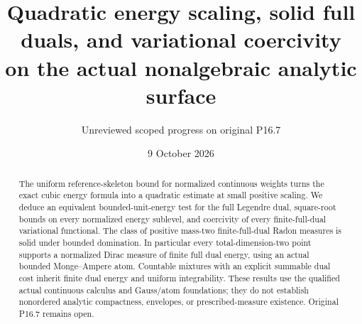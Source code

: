\documentclass[11pt]{article}
\title{Quadratic energy scaling, solid full duals, and variational coercivity\\on the actual nonalgebraic analytic surface}
\author{Unreviewed scoped progress on original P16.7}
\date{9 October 2026}
\begin{document}
\maketitle
\begin{abstract}
The uniform reference-skeleton bound for normalized continuous weights
turns the exact cubic energy formula into a quadratic estimate at small
positive scaling. We deduce an equivalent bounded-unit-energy test for
the full Legendre dual, square-root bounds on every normalized energy
sublevel, and coercivity of every finite-full-dual variational functional.
The class of positive mass-two finite-full-dual Radon measures is solid
under bounded domination. In particular every total-dimension-two point
supports a normalized Dirac measure of finite full dual energy, using
an actual bounded Monge--Ampere atom. Countable mixtures with an explicit
summable dual cost inherit finite dual energy and uniform integrability.
These results use the qualified actual continuous calculus and Gauss/atom
foundations; they do not establish nonordered analytic compactness,
envelopes, or prescribed-measure existence. Original P16.7 remains open.
\end{abstract}
\end{document}
